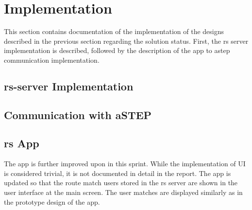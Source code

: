 \section{Implementation}
This section contains documentation of the implementation of the designs described in the previous section regarding the solution status.
First, the \gls{rs} server implementation is described, followed by the description of the app to \gls{astep} communication implementation.

\subsection{\gls{rs}-server Implementation}


\subsection{Communication with aSTEP}


\subsection{\gls{rs} App}
The app is further improved upon in this sprint.
While the implementation of UI is considered trivial, it is not documented in detail in the report.
The app is updated so that the route match users stored in the \gls{rs} server are shown in the user interface at the main screen.
The user matches are displayed similarly as in the prototype design of the app.